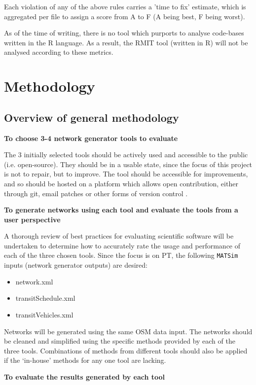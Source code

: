 \documentclass[11pt]{article}
\begin{document}
Each violation of any of the above rules carries a 'time to fix' estimate, which is aggregated per file to assign a score from A to F (A being best, F being worst).

As of the time of writing, there is no tool which purports to analyse code-bases written in the R language. As a result, the RMIT tool (written in R) will not be analysed according to these metrics.
\section{Methodology}
\label{sec:org682f795}
\subsection{Overview of general methodology}
\label{sec:org0e14db4}
\textbf{To choose 3-4 network generator tools to evaluate}

The 3 initially selected tools should be actively used and accessible to the public (i.e. open-source). They should be in a usable state, since the focus of this project is not to repair, but to improve. The tool should be accessible for improvements, and so should be hosted on a platform which allows open contribution, either through git, email patches or other forms of version control .

\textbf{To generate networks using each tool and evaluate the tools from a user perspective}

A thorough review of best practices for evaluating scientific software will be undertaken to determine how to accurately rate the usage and performance of each of the three chosen tools.
Since the focus is on PT, the following \texttt{MATSim} inputs (network generator outputs) are desired:

\begin{itemize}
\item network.xml
\item transitSchedule.xml
\item transitVehicles.xml
\end{itemize}

Networks will be generated using the same OSM data input.
The networks should be cleaned and simplified using the specific methods provided by each of the three tools. Combinations of methods from different tools should also be applied if the ‘in-house’ methods for any one tool are lacking.

\textbf{To evaluate the results generated by each tool}
\end{document}
